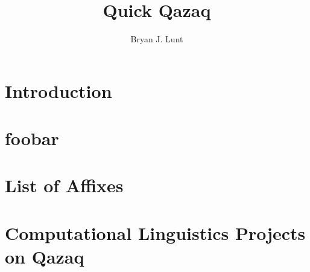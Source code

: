 \documentclass[12pt]{qqbook}
\title{Quick Qazaq}
\author{Bryan J. Lunt}
\date{} %
\begin{document}
\frontmatter
\maketitle
\tableofcontents

\mainmatter

\chapter{Introduction}
\lipsum[1-4]

\chapter{foobar}


\appendix %
\chapter{List of Affixes}
\lipsum[1]

\chapter{Computational Linguistics Projects on Qazaq}
\lipsum[2]

\backmatter
\lipsum[1]
\end{document}
